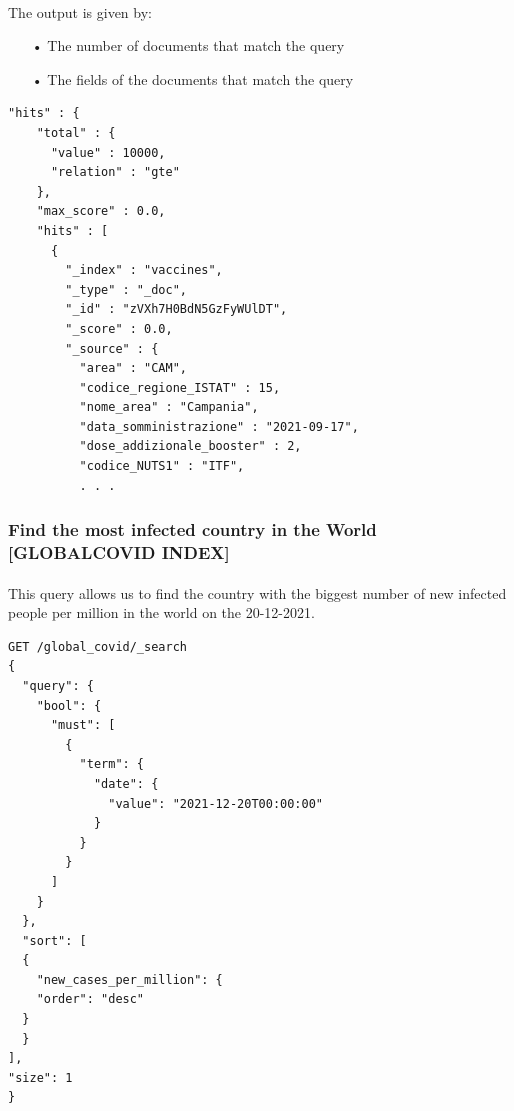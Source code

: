 \documentclass[a4paper,12pt]{article}
\begin{document}
\paragraph{} The output is given by: 
\begin{itemize}[noitemsep]
\item[•] The number of documents that match the query
\item[•] The fields of the documents that match the query
\end{itemize}

\begin{tcolorbox}[colback=red!5!white,colframe=red!75!black,title=OUTPUT]
\begin{verbatim}
"hits" : {
    "total" : {
      "value" : 10000,
      "relation" : "gte"
    },
    "max_score" : 0.0,
    "hits" : [
      {
        "_index" : "vaccines",
        "_type" : "_doc",
        "_id" : "zVXh7H0BdN5GzFyWUlDT",
        "_score" : 0.0,
        "_source" : {
          "area" : "CAM",
          "codice_regione_ISTAT" : 15,
          "nome_area" : "Campania",
          "data_somministrazione" : "2021-09-17",
          "dose_addizionale_booster" : 2,
          "codice_NUTS1" : "ITF",
          . . .
\end{verbatim}
\end{tcolorbox}
\newpage

\subsubsection{Find the most infected country in the World [GLOBAL\textunderscore COVID INDEX]  }
\paragraph{} This query allows us to find the country with the biggest number of new infected people per million in the world on the 20-12-2021.
\begin{tcolorbox}[colback=green!5!white,colframe=green!75!black,title=QUERY]
\begin{verbatim}
GET /global_covid/_search
{ 
  "query": {
    "bool": {
      "must": [
        {
          "term": {
            "date": {
              "value": "2021-12-20T00:00:00"
            }
          }
        }
      ]
    }
  }, 
  "sort": [
  {
    "new_cases_per_million": {
    "order": "desc"
  }
  }
],
"size": 1
}
\end{verbatim}
\end{tcolorbox}
\newpage
\end{document}
